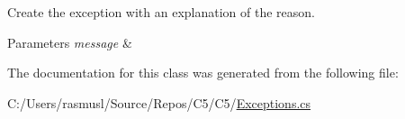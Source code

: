 Create the exception with an explanation of the reason. 


\begin{DoxyParams}{Parameters}
{\em message} & \\
\hline
\end{DoxyParams}


The documentation for this class was generated from the following file\+:\begin{DoxyCompactItemize}
\item 
C\+:/\+Users/rasmusl/\+Source/\+Repos/\+C5/\+C5/\hyperlink{_exceptions_8cs}{Exceptions.\+cs}\end{DoxyCompactItemize}
